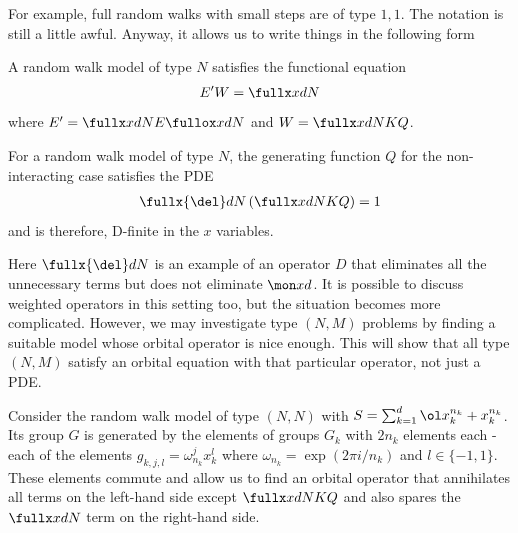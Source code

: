 For example, full random walks with small steps are of type $1,1$. The notation is still a little awful. Anyway, it allows us to write things in the following form
\begin{theorem} A random walk model of type $N$ satisfies the functional equation
\begin{align}
	E'W = \fullx xdN
\end{align}
where $E' = \fullx xdN E \fullox xdN$ and $W  = \fullx xdN KQ$.
\end{theorem}

\begin{corollary} For a random walk model of type $N$, the generating function $Q$ for the non-interacting case satisfies the PDE
\begin{align}
	\fullx{\del}dN\left(\fullx xdN KQ\right) = 1
\end{align}
and is therefore, D-finite in the $x$ variables.
\end{corollary}
Here $\fullx{\del}dN$ is an example of an operator $D$ that eliminates all the unnecessary terms but does not eliminate $\mon xd$. It is possible to discuss weighted operators in this setting too, but the situation becomes more complicated. However, we may investigate type $(N,M)$ problems by finding a suitable model whose orbital operator is nice enough. This will show that all type $(N,M)$ satisfy an orbital equation with that particular operator, not just a PDE. 

\begin{example} Consider the random walk model of type $(N,N)$ with $S = \sum_{k=1}^d \ol x_k^{n_k} + x_k^{n_k}$. Its group $G$ is generated by the elements of groups $G_k$ with $2n_k$ elements each - each of the elements $g_{k,j,l} = \omega_{n_k}^jx_k^l$ where $\omega_{n_k} = \exp(2\pi i/n_k)$ and $l\in\{-1,1\}$. These elements commute and allow us to find an orbital operator that annihilates all terms on the left-hand side except  $\fullx xdN KQ$ and also spares the $\fullx xdN$ term on the right-hand side.
\end{example}
